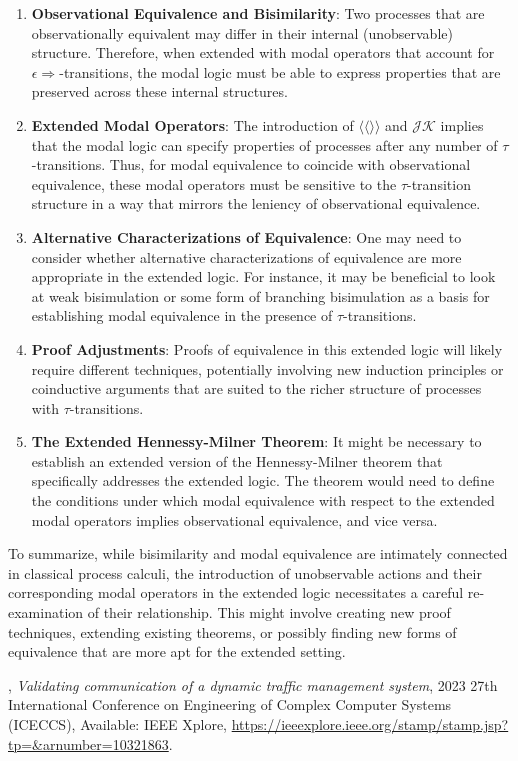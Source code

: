 \documentclass{article}
\begin{document}
\begin{enumerate}
    \item \textbf{Observational Equivalence and Bisimilarity}: Two processes that are observationally equivalent may differ in their internal (unobservable) structure. Therefore, when extended with modal operators that account for $\epsilon\Rightarrow$-transitions, the modal logic must be able to express properties that are preserved across these internal structures.
    
    \item \textbf{Extended Modal Operators}: The introduction of $\langle\langle \rangle\rangle$ and $\mathcal{J}\mathcal{K}$ implies that the modal logic can specify properties of processes after any number of $\tau$-transitions. Thus, for modal equivalence to coincide with observational equivalence, these modal operators must be sensitive to the $\tau$-transition structure in a way that mirrors the leniency of observational equivalence.
    
    \item \textbf{Alternative Characterizations of Equivalence}: One may need to consider whether alternative characterizations of equivalence are more appropriate in the extended logic. For instance, it may be beneficial to look at weak bisimulation or some form of branching bisimulation as a basis for establishing modal equivalence in the presence of $\tau$-transitions.
    
    \item \textbf{Proof Adjustments}: Proofs of equivalence in this extended logic will likely require different techniques, potentially involving new induction principles or coinductive arguments that are suited to the richer structure of processes with $\tau$-transitions.
    
    \item \textbf{The Extended Hennessy-Milner Theorem}: It might be necessary to establish an extended version of the Hennessy-Milner theorem that specifically addresses the extended logic. The theorem would need to define the conditions under which modal equivalence with respect to the extended modal operators implies observational equivalence, and vice versa.
\end{enumerate}

To summarize, while bisimilarity and modal equivalence are intimately connected in classical process calculi, the introduction of unobservable actions and their corresponding modal operators in the extended logic necessitates a careful re-examination of their relationship. This might involve creating new proof techniques, extending existing theorems, or possibly finding new forms of equivalence that are more apt for the extended setting.


\begin{thebibliography}{9}

  \textsc{},
  \textit{Validating communication of a dynamic traffic management system},
  2023 27th International Conference on Engineering of Complex Computer Systems (ICECCS),
  Available: IEEE Xplore,
  \url{https://ieeexplore.ieee.org/stamp/stamp.jsp?tp=&arnumber=10321863}.

\end{thebibliography}
\end{document}

